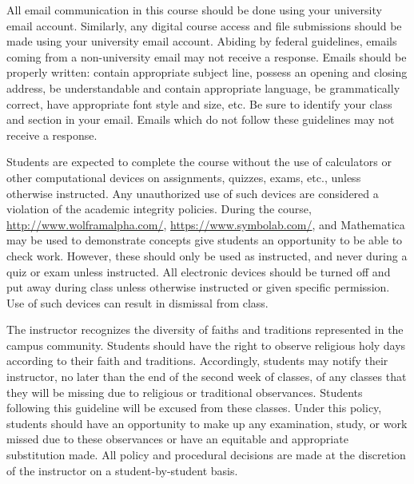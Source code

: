 \documentclass[11pt,letterpaper]{article}
\begin{document}

All email communication in this course should be done using your university email account. Similarly, any digital course access and file submissions should be made using your university email account. Abiding by federal guidelines, emails coming from a non-university email may not receive a response. Emails should be properly written: contain appropriate subject line, possess an opening and closing address, be understandable and contain appropriate language, be grammatically correct, have appropriate font style and size, etc. Be sure to identify your class and section in your email. Emails which do not follow these guidelines may not receive a response. 
\sectionbreak




Students are expected to complete the course without the use of calculators or other computational devices on assignments, quizzes, exams, etc., unless otherwise instructed. Any unauthorized use of such devices are considered a violation of the academic integrity policies. During the course, \href{http://www.wolframalpha.com/}{http://www.wolframalpha.com/}, \href{https://www.symbolab.com/}{https://www.symbolab.com/}, and Mathematica may be used to demonstrate concepts give students an opportunity to be able to check work. However, these should only be used as instructed, and never during a quiz or exam unless instructed. All electronic devices should be turned off and put away during class unless otherwise instructed or given specific permission. Use of such devices can result in dismissal from class.
\sectionbreak




The instructor recognizes the diversity of faiths and traditions represented in the campus community. Students should have the right to observe religious holy days according to their faith and traditions. Accordingly, students may notify their instructor, no later than the end of the second week of classes, of any classes that they will be missing due to religious or traditional observances. Students following this guideline will be excused from these classes. Under this policy, students should have an opportunity to make up any examination, study, or work missed due to these observances or have an equitable and appropriate substitution made. All policy and procedural decisions are made at the discretion of the instructor on a student-by-student basis. 
\sectionbreak
\end{document}
